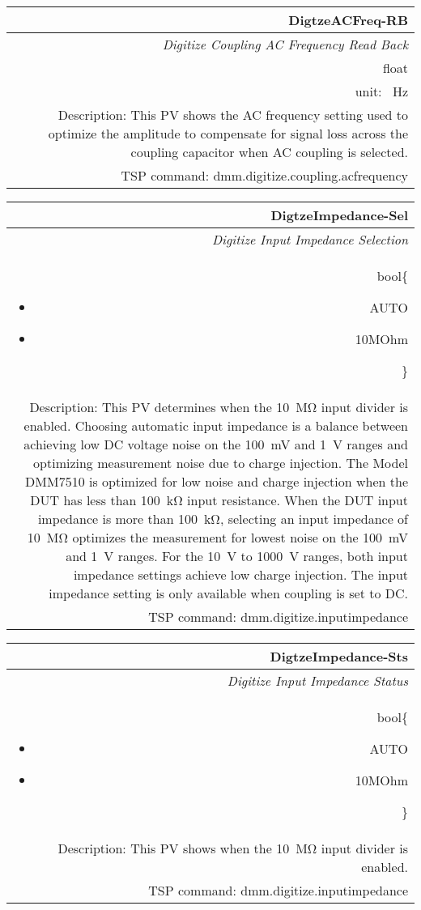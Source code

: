 \documentclass[openany]{article}
\begin{document}
		\begin{tabular}{N}
			\hline
			\bfseries DigtzeACFreq-RB\label{pv:digtzeacfreq-rb} \\ \hline
			\emph{Digitize Coupling AC Frequency Read Back} \\
			float \\
			unit: \SI{}{\hertz} \\
			Description: This PV shows the AC frequency setting used to optimize the amplitude to compensate for signal loss across the coupling capacitor when AC coupling is selected. \\
			TSP command: dmm.digitize.coupling.acfrequency
		\end{tabular}

		\begin{tabular}{N}
			\hline
			\bfseries DigtzeImpedance-Sel\label{pv:digtzeimpedance-sel} \\ \hline
			\emph{Digitize Input Impedance Selection} \\
			bool\{\begin{itemize}[noitemsep]
				\small
				\item[] AUTO
				\item[] 10MOhm
			\end{itemize}\} \\

			Description: This PV determines when the \SI{10}{\mega\ohm} input divider is enabled. Choosing automatic input impedance is a balance between achieving low DC voltage noise on the \SI{100}{\milli\volt} and \SI{1}{\volt} ranges and optimizing measurement noise due to charge injection. The Model DMM7510 is optimized for low noise and charge injection when the DUT has less than \SI{100}{\kilo\ohm} input resistance. When the DUT input impedance is more than \SI{100}{\kilo\ohm}, selecting an input impedance of \SI{10}{\mega\ohm} optimizes the measurement for lowest noise on the \SI{100}{\milli\volt} and \SI{1}{\volt} ranges. For the \SI{10}{\volt} to \SI{1000}{\volt} ranges, both input impedance settings achieve low charge injection. The input impedance setting is only available when coupling is set to DC. \\
			TSP command: dmm.digitize.inputimpedance
		\end{tabular}

		\begin{tabular}{N}
			\hline
			\bfseries DigtzeImpedance-Sts\label{pv:digtzeimpedance-sts} \\ \hline
			\emph{Digitize Input Impedance Status} \\
			bool\{\begin{itemize}[noitemsep]
				\small
				\item[] AUTO
				\item[] 10MOhm
			\end{itemize}\} \\
			Description: This PV shows when the \SI{10}{\mega\ohm} input divider is enabled. \\
			TSP command: dmm.digitize.inputimpedance
		\end{tabular}
\end{document}

